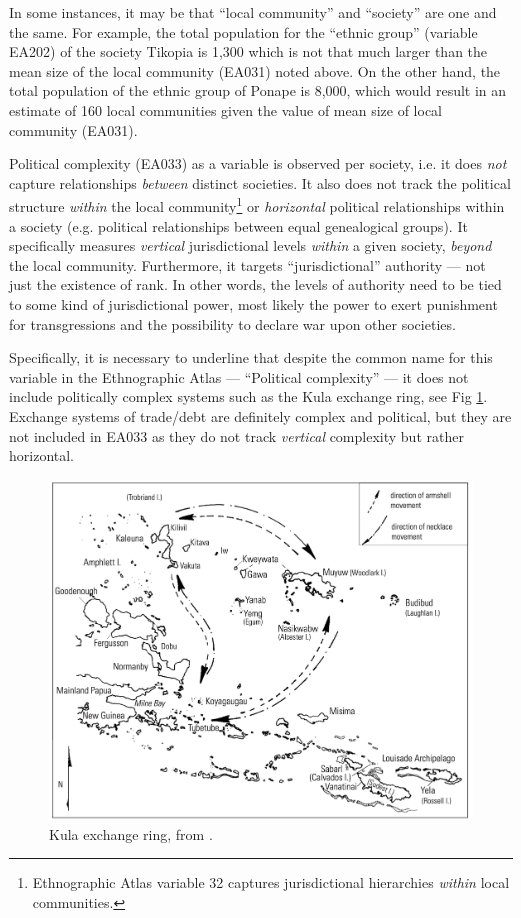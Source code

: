 \documentclass[unnumsec,webpdf,modern,medium]{oup-authoring-template}
\begin{document}
\begin{appendices}
In some instances, it may be that ``local community'' and ``society'' are one and the same. For example, the total population for the ``ethnic group'' (variable EA202) of the society Tikopia is 1,300 which is not that much larger than the mean size of the local community (EA031) noted above. On the other hand, the total population of the ethnic group of Ponape is 8,000, which would result in an estimate of 160 local communities given the value of mean size of local community (EA031).
  
Political complexity (EA033) as a variable is observed per society, i.e. it does \emph{not} capture relationships \emph{between} distinct societies. It also does not track the political structure \emph{within} the local community\footnote{Ethnographic Atlas variable 32 captures jurisdictional hierarchies \emph{within} local communities.} or \emph{horizontal} political relationships within a society (e.g. political relationships between equal genealogical groups). It specifically measures \emph{vertical} jurisdictional levels \emph{within} a given society, \emph{beyond} the local community. Furthermore, it targets ``jurisdictional'' authority --- not just the existence of rank. In other words, the levels of authority need to be tied to some kind of jurisdictional power, most likely the power to exert punishment for transgressions and the possibility to declare war upon other societies. 

Specifically, it is necessary to underline that despite the common name for this variable in the Ethnographic Atlas --- ``Political complexity'' --- it does not include politically complex systems such as the Kula exchange ring\citet{damon2002kula}, see Fig \ref{kula_ring}. Exchange systems of trade/debt are definitely complex and political, but they are not included in EA033 as they do not track \emph{vertical} complexity but rather horizontal.

\begin{figure}[ht]
\centering
\includegraphics[width=\textwidth]{latex/kula_ring_damon.png}
\caption{Kula exchange ring, from \citet{damon2002kula}.}
\label{kula_ring}
\end{figure}


\end{appendices}
\end{document}
